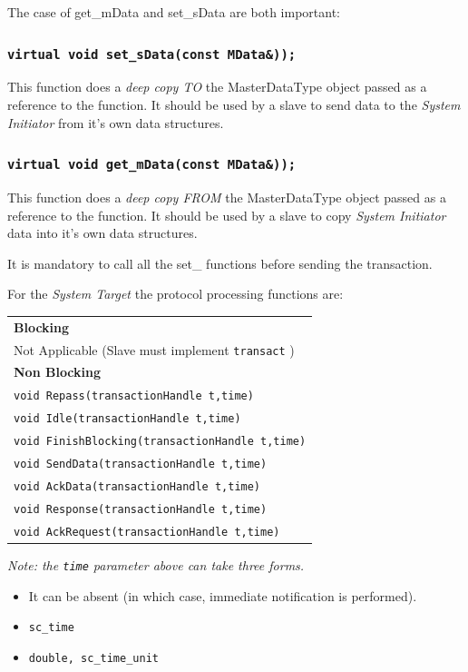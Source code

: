 \documentclass[12pt,oneside]{gsbook}
\newcommand{\master}{{\em System Initiator}\xspace}
\newcommand{\slave}{{\em System Target}\xspace}
\begin{document}
The case of get\_mData and set\_sData are both important:

\subsubsection{\tt virtual void set\_sData(const MData\&));}
This function does a {\em deep copy TO} the MasterDataType object
passed as a reference to the function. It should be used by a slave to
send data to the \master from it's own data structures.

\subsubsection{\tt virtual void get\_mData(const MData\&));}
This function does a {\em deep copy FROM} the MasterDataType object
passed as a reference to the function. It should be used by a slave to
copy \master data into it's own data structures.


It is mandatory to call all the set\_ functions before sending the
transaction.

For the \slave  the protocol processing functions are:

\begin{tabular}{|l|}
\hline
{\bf Blocking}\\
    Not Applicable (Slave must implement {\tt transact} )\\
\hline
{\bf Non Blocking}\\
    {\tt void Repass(transactionHandle t,time)}\\
    {\tt void Idle(transactionHandle t,time)}\\
    {\tt void FinishBlocking(transactionHandle t,time)}\\
    {\tt void SendData(transactionHandle t,time)}\\
    {\tt void AckData(transactionHandle t,time)}\\
    {\tt void Response(transactionHandle t,time)}\\
    {\tt void AckRequest(transactionHandle t,time)}\\
\hline
\end{tabular}

{\em Note: the {\tt time} parameter above can take three forms. 
\begin{itemize}
\item It can be absent (in which case, immediate notification is
performed).
\item {\tt sc\_time}
\item {\tt double, sc\_time\_unit}
\end{itemize}}
\end{document}
